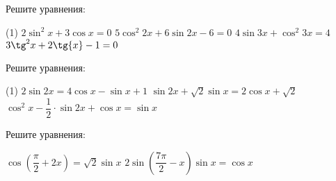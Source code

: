 \begin{homework}[number=3]
	\begin{listofex}
		\item Решите уравнения:
		\begin{tasks}(1)
			\task \( 2\sin^2x+3\cos{x}=0 \)
			\task \( 5\cos^2{2x}+6\sin{2x}-6=0 \)
			\task \( 4\sin{3x}+\cos^2{3x}=4 \)
			\task \( 3\tg^2{x}+2\tg{x}-1=0 \)
		\end{tasks}
		\item Решите уравнения:
		\begin{tasks}(1)
			\task \( 2\sin{2x}=4\cos{x}-\sin{x}+1 \)
			\task \( \sin{2x}+\sqrt{2}\sin{x}=2\cos{x}+\sqrt{2} \)
			\task \( \cos^2{x}-\dfrac{1}{2} \cdot \sin{2x} + \cos{x} = \sin{x} \)
		\end{tasks}
		\item Решите уравнения:
		\begin{tasks}
			\task \( \cos{\left( \dfrac{\pi}{2}+2x \right)} = \sqrt{2} \sin{x} \)
			\task \( 2\sin{ \left( \dfrac{7\pi}{2}-x \right)} \sin{x}=\cos{x} \)
		\end{tasks}
	\end{listofex}
\end{homework}

